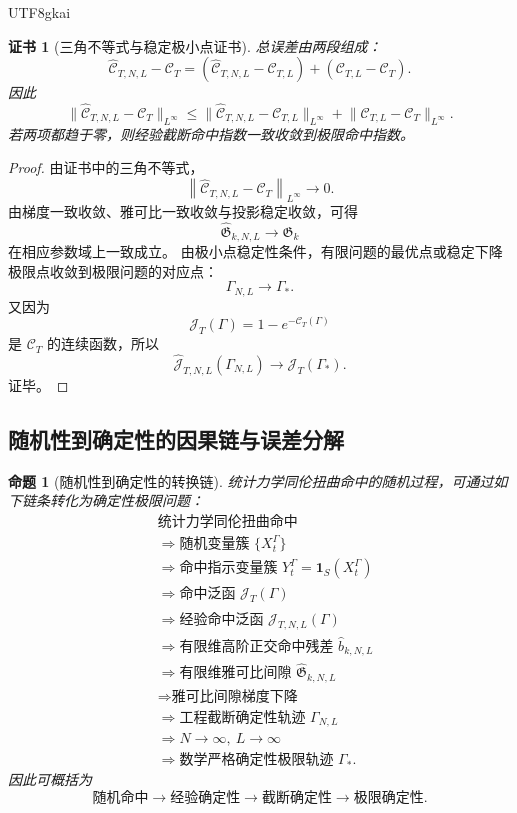 \documentclass[12pt]{article}
\newtheorem{proposition}{命题}[section]
\newtheorem{Certificate}{证书}[section]
\begin{document}
\begin{CJK*}{UTF8}{gkai}
\begin{Certificate}[三角不等式与稳定极小点证书]
\label{cert:tex55-engdet-deterministic-limit}
总误差由两段组成：
\[
  \widehat{\mathcal C}_{T,N,L}-\mathcal C_T
  =
  \left(
  \widehat{\mathcal C}_{T,N,L}-\mathcal C_{T,L}
  \right)
  +
  \left(
  \mathcal C_{T,L}-\mathcal C_T
  \right).
\]
因此
\[
  \lVert
  \widehat{\mathcal C}_{T,N,L}-\mathcal C_T
  \rVert_{L^\infty}
  \le
  \lVert
  \widehat{\mathcal C}_{T,N,L}-\mathcal C_{T,L}
  \rVert_{L^\infty}
  +
  \lVert
  \mathcal C_{T,L}-\mathcal C_T
  \rVert_{L^\infty}.
\]
若两项都趋于零，则经验截断命中指数一致收敛到极限命中指数。
\end{Certificate}

\begin{proof}
由证书中的三角不等式，
\[
  \left\lVert
  \widehat{\mathcal C}_{T,N,L}
  -
  \mathcal C_T
  \right\rVert_{L^\infty}
  \to0.
\]
由梯度一致收敛、雅可比一致收敛与投影稳定收敛，可得
\[
  \widehat{\mathfrak G}_{k,N,L}
  \to
  \mathfrak G_k
\]
在相应参数域上一致成立。
由极小点稳定性条件，有限问题的最优点或稳定下降极限点收敛到极限问题的对应点：
\[
  \Gamma_{N,L}\to\Gamma_*.
\]
又因为
\[
  \mathcal J_T(\Gamma)=1-e^{-\mathcal C_T(\Gamma)}
\]
是 \(\mathcal C_T\) 的连续函数，所以
\[
  \widehat{\mathcal J}_{T,N,L}(\Gamma_{N,L})
  \to
  \mathcal J_T(\Gamma_*).
\]
证毕。
\end{proof}

\subsection{随机性到确定性的因果链与误差分解}
\label{subsec:tex55-engdet-chain-error}

\begin{proposition}[随机性到确定性的转换链]
\label{prop:tex55-engdet-random-to-deterministic-chain}
统计力学同伦扭曲命中的随机过程，可通过如下链条转化为确定性极限问题：
\[
\begin{aligned}
  &\text{统计力学同伦扭曲命中}\\
  &\Longrightarrow
  \text{随机变量簇 }\{X_t^\Gamma\}\\
  &\Longrightarrow
  \text{命中指示变量簇 }Y_t^\Gamma=\mathbf 1_S(X_t^\Gamma)\\
  &\Longrightarrow
  \text{命中泛函 }\mathcal J_T(\Gamma)\\
  &\Longrightarrow
  \text{经验命中泛函 }\widehat{\mathcal J}_{T,N,L}(\Gamma)\\
  &\Longrightarrow
  \text{有限维高阶正交命中残差 }\widehat b_{k,N,L}\\
  &\Longrightarrow
  \text{有限维雅可比间隙 }\widehat{\mathfrak G}_{k,N,L}\\
  &\Longrightarrow
  \text{雅可比间隙梯度下降}\\
  &\Longrightarrow
  \text{工程截断确定性轨迹 }\Gamma_{N,L}\\
  &\Longrightarrow
  N\to\infty,\ L\to\infty\\
  &\Longrightarrow
  \text{数学严格确定性极限轨迹 }\Gamma_*.
\end{aligned}
\]
因此可概括为
\[
  \boxed{
  \text{随机命中}
  \to
  \text{经验确定性}
  \to
  \text{截断确定性}
  \to
  \text{极限确定性}.
  }
\]
\end{proposition}


\end{CJK*}
\end{document}
